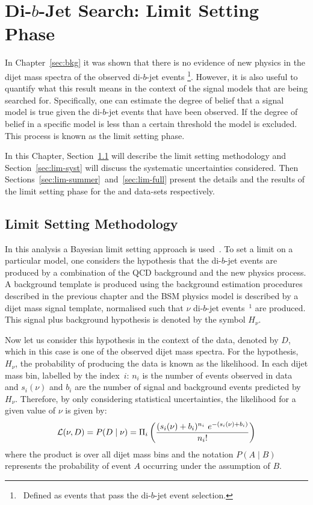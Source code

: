 \chapter{Di-$b$-Jet Search: Limit Setting Phase}
\label{sec:lim}

In Chapter~\ref{sec:bkg} it was shown that there is no evidence of new physics in the dijet mass spectra of the observed di-$b$-jet events
\footnote{\ Defined as events that pass the di-$b$-jet event selection.}. %
However, it is also useful to quantify what this result means in the context
of the signal models that are being searched for.
Specifically, one can estimate the degree of belief that a signal model is true given the di-$b$-jet events that have been observed.
If the degree of belief in a specific model is less than a certain threshold the model is excluded.
This process is known as the limit setting phase.

In this Chapter,
Section~\ref{sec:lim-strat} will describe the limit setting methodology and
Section~\ref{sec:lim-syst} will discuss the systematic uncertainties considered.
Then Sections~\ref{sec:lim-summer}~and~\ref{sec:lim-full} present the details and
the results of the limit setting phase for the \summer{} and \lm{} data-sets respectively.

\section{Limit Setting Methodology}
\label{sec:lim-strat}

In this analysis a Bayesian limit setting approach is used~\cite{det-thesis_kate,lim-bayes}.
To set a limit on a particular model, one considers the hypothesis that the di-$b$-jet events
are produced by a combination of the QCD background and the new physics process.
A background template is produced using the background estimation procedures described in the previous chapter
and the BSM physics model is described by a dijet mass signal template, normalised such that $\nu$ di-$b$-jet events~$^{1}$ are produced.  %
This signal plus background hypothesis is denoted by the symbol $H_{\nu}$.

Now let us consider this hypothesis in the context of the data, denoted by $D$,
which in this case is one of the observed dijet mass spectra.
For the hypothesis, $H_{\nu}$, the probability of producing the data is known as the likelihood.
In each dijet mass bin, labelled by the index~$i$: $n_i$ is the number of events observed in data
and $s_i(\nu)$ and $b_i$ are the number of signal and background events predicted by $H_{\nu}$.
Therefore, by only considering statistical uncertainties, the likelihood for a given value of $\nu$ is given by:
\begin{equation}
  \mathcal{L} (\nu,D) = P(D \mid \nu) =  \Pi_i \left(\frac{(s_i(\nu)+b_i)^{n_i}~e^{-(s_i(\nu)+b_i)}}{n_i!}\right)
  \label{eqn:lim-like}
\end{equation}
where the product is over all dijet mass bins and
the notation $P(A \mid B)$ represents the probability of event $A$ occurring
under the assumption of $B$.

